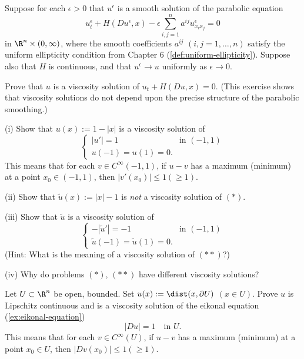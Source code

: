 \begin{exercise}
Suppose for each $\epsilon > 0$ that $u^\epsilon$ is a smooth solution of the parabolic equation
\[
u_t^\epsilon + H(Du^\epsilon, x) - \epsilon \sum_{i,j=1}^n a^{ij} u^\epsilon_{x_i x_j} = 0
\]
in $\R^n \times (0, \infty)$, where the smooth coefficients $a^{ij}$ $(i,j = 1, \ldots, n)$ satisfy the uniform ellipticity condition from Chapter 6 (\cref{def:uniform-ellipticity}). Suppose also that $H$ is continuous, and that $u^\epsilon \to u$ uniformly as $\epsilon \to 0$.

Prove that $u$ is a viscosity solution of $u_t + H(Du, x) = 0$. (This exercise shows that viscosity solutions do not depend upon the precise structure of the parabolic smoothing.)
\end{exercise}

\begin{exercise}
(i) Show that $u(x) := 1 - |x|$ is a viscosity solution of
\[
\begin{cases} |u'| = 1 & \text{in } (-1,1) \\ u(-1) = u(1) = 0. \end{cases}
\tag{$*$}
\]
This means that for each $v \in C^\infty(-1,1)$, if $u - v$ has a maximum (minimum) at a point $x_0 \in (-1,1)$, then $|v'(x_0)| \le 1 (\ge 1)$.

(ii) Show that $\tilde{u}(x) := |x| - 1$ is \textit{not} a viscosity solution of $(*)$.

(iii) Show that $\tilde{u}$ is a viscosity solution of
\[
\begin{cases} -|\tilde{u}'| = -1 & \text{in } (-1,1) \\ \tilde{u}(-1) = \tilde{u}(1) = 0. \end{cases}
\tag{$**$}
\]
(Hint: What is the meaning of a viscosity solution of $(**)$?)

(iv) Why do problems $(*)$, $(**)$ have different viscosity solutions?
\end{exercise}

\begin{exercise}
Let $U \subset \R^n$ be open, bounded. Set $u(x) := \dist(x,\partial U)$ $(x \in U)$. Prove $u$ is Lipschitz continuous and is a viscosity solution of the eikonal equation (\cref{ex:eikonal-equation})
\[
|Du| = 1 \quad \text{in } U.
\]
This means that for each $v \in C^\infty(U)$, if $u - v$ has a maximum (minimum) at a point $x_0 \in U$, then $|Dv(x_0)| \le 1 (\ge 1)$.
\end{exercise}

